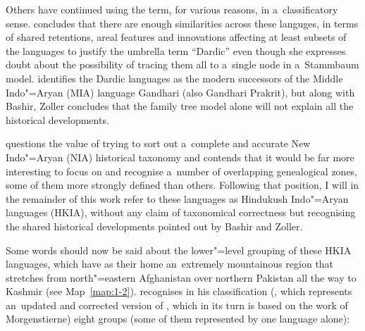 Others have continued using the term, for various reasons, in a~classificatory sense. \citet[822]{bashir2003} concludes that there are enough similarities across these languges, in terms of shared retentions, areal features and innovations affecting at least subsets of the languages to justify the umbrella term ``Dardic'' even though she expresses doubt about the possibility of tracing them all to a~single node in a~Stammbaum model. \citet[10--11]{zoller2005} identifies the Dardic languages as the modern successors of the Middle Indo"=Aryan (MIA) language Gandhari (also Gandhari Prakrit), but along with Bashir, Zoller concludes that the family tree model alone will not explain all the historical developments. 


\citet[460]{masica1991} questions the value of trying to sort out a~complete and accurate New Indo"=Aryan (NIA) historical taxonomy and contends that it would be far more interesting to focus on and recognise a~number of overlapping genealogical zones, some of them more strongly defined than others. Following that position, I will in the remainder of this work refer to these languages as Hindukush Indo"=Aryan languages (HKIA), without any claim of taxonomical correctness but recognising the shared historical developments pointed out by Bashir and Zoller. 


Some words should now be said about the lower"=level grouping of these HKIA languages, which have as their home an~extremely mountainous region that stretches from north"=eastern Afghanistan over northern Pakistan all the way to Kashmir (see Map~\ref{map:1-2}). \citeauthor{strand2001} recognises in his classification (\citeyear[258]{strand2001}, which represents an~updated and corrected version of \citealt{strand1973}, which in its turn is based on the work of Morgenstierne) eight groups (some of them represented by one language alone): 

